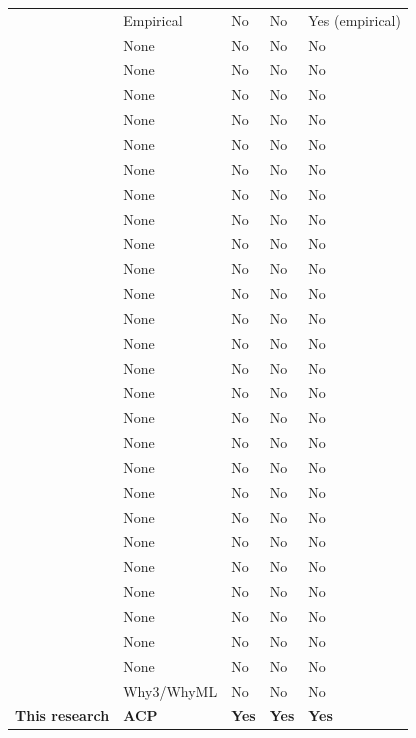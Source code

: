 \begin{longtable}[]{@{}lllll@{}}
\citep{Delgado_von_Eitzen_2025} & Empirical & No & No & Yes
(empirical) \\
\citep{soureshjani2026} & None & No & No & No \\
\citep{Notland_2026} & None & No & No & No \\
\citep{Augusto_2023} & None & No & No & No \\
\citep{Pillai_2022} & None & No & No & No \\
\citep{Cheng_2024} & None & No & No & No \\
\citep{Kotey_2023} & None & No & No & No \\
\citep{Li_2023} & None & No & No & No \\
\citep{wang2023} & None & No & No & No \\
\citep{Wu_2023} & None & No & No & No \\
\citep{Chen_2023} & None & No & No & No \\
\citep{Sober_2022} & None & No & No & No \\
\citep{Wang_2022} & None & No & No & No \\
\citep{Mohammed_Abdul_2024} & None & No & No & No \\
\citep{Kumar_2025} & None & No & No & No \\
\citep{Caetano_da_Silva_2025} & None & No & No & No \\
\citep{augusto2025} & None & No & No & No \\
\citep{kishore2025interoperability} & None & No & No & No \\
\citep{A_Alzahrani_2025} & None & No & No & No \\
\citep{sottomayor2024enterprise} & None & No & No & No \\
\citep{Li_2024} & None & No & No & No \\
\citep{Harris_2023} & None & No & No & No \\
\citep{Mao_2023} & None & No & No & No \\
\citep{Ou_2022} & None & No & No & No \\
\citep{kang2022} & None & No & No & No \\
\citep{Lohachab_2021} & None & No & No & No \\
\citep{Belchior_2021} & None & No & No & No \\
\citep{horta2020} & Why3/WhyML & No & No & No \\
\textbf{\textbf{This research}} & \textbf{\textbf{ACP}} &
\textbf{\textbf{Yes}} & \textbf{\textbf{Yes}} & \textbf{\textbf{Yes}} \\
\end{longtable}
